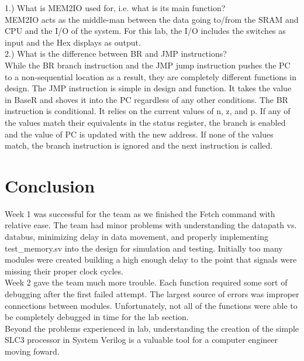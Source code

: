 \documentclass[journal, twocolumn, final,11pt,letterpaper]{IEEEtran}
\begin{document}
1.) What is MEM2IO used for, i.e. what is its main function? \\

MEM2IO acts as the middle-man between the data going to/from the SRAM and CPU and the I/O of the system.  For this lab, the I/O includes the switches as input and the Hex displays as output. \\  

2.) What is the difference between BR and JMP instructions?\\

While the BR branch instruction and the JMP jump instruction pushes the PC to a non-sequential location as a result, they are completely different functions in design.  The JMP instruction is simple in design and function.  It takes the value in BaseR and shoves it into the PC regardless of any other conditions.  The BR instruction is conditional.  It relies on the current values of n, z, and p.  If any of the values match their equivalents in the status register, the branch is enabled and the value of PC is updated with the new address.  If none of the values match, the branch instruction is ignored and the next instruction is called.  \\    

\section{Conclusion}
Week 1 was successful for the team as we finished the Fetch command with relative ease.  The team had minor problems with understanding the datapath vs. databus, minimizing delay in data movement, and properly implementing test\_memory.sv into the design for simulation and testing.  Initially too many modules were created building a high enough delay to the point that signals were missing their proper clock cycles.  \\

Week 2 gave the team much more trouble.  Each function required some sort of debugging after the first failed attempt.  The largest source of errors was improper connections between modules.  Unfortunately, not all of the functions were able to be completely debugged in time for the lab section. \\

Beyond the problems experienced in lab, understanding the creation of the simple SLC3 processor in System Verilog is a valuable tool for a computer engineer moving foward.   \\      
\end{document}
